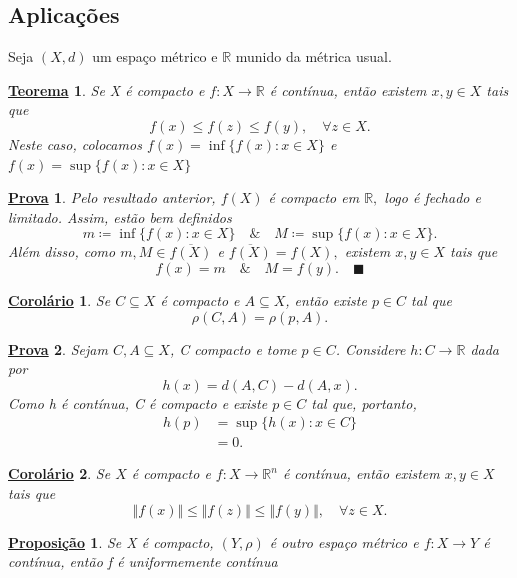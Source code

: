 \documentclass{article}
\newtheorem*{theorem*}{\underline{Teorema}}
\newtheorem*{prop*}{\underline{Proposi\c c\~ao}}
\newtheorem*{crl*}{\underline{Corolário}}
\newtheorem*{proof*}{\underline{Prova}}
\renewcommand\qedsymbol{$\blacksquare$}
\begin{document}
\subsection{Aplicações}
  Seja \((X, d)\) um espaço métrico e \(\mathbb{R}\) munido da métrica usual.
 \begin{theorem*}
  Se X é compacto e \(f:X\rightarrow \mathbb{R}\) é contínua, então existem \(x, y\in X\) tais que 
  \[
    f(x)\leq f(z)\leq f(y),\quad \forall z\in X.
  \]
  Neste caso, colocamos \(f(x)=\inf\{f(x):x\in X\}\) e \(f(x) = \sup\{f(x):x\in X\}\)
 \end{theorem*}
 \begin{proof*}
  Pelo resultado anterior, \(f(X)\) é compacto em \(\mathbb{R},\) logo é fechado e limitado. Assim, estão bem definidos 
    \[
      m\coloneqq \inf\{f(x):x\in X\}\quad\&\quad M\coloneqq \sup\{f(x):x\in X\}.
    \]
    Além disso, como \(m, M\in \overline{f(X)}\) e \(\overline{f(X)} = f(X),\) existem \(x, y\in X\) tais que
      \[
        f(x) = m\quad\&\quad M = f(y).\quad \text{\qedsymbol}
      \]
 \end{proof*}
 \begin{crl*}
  Se \(C\subseteq X\) é compacto e \(A\subseteq X\), então existe \(p\in C\) tal que  
    \[
      \rho (C, A) = \rho (p, A).
    \]
 \end{crl*}
 \begin{proof*}
  Sejam \(C, A\subseteq X\), C compacto e tome \(p\in C\). Considere \(h:C\rightarrow \mathbb{R}\) dada por 
    \[
      h(x) = d(A, C) - d(A, x).
    \]
  Como h é contínua, C é compacto e existe \(p\in C\) tal que, portanto,
 \begin{align*}
  h(p) &= \sup\{h(x):x\in C\}\\ 
       &= 0.
 \end{align*}
 \end{proof*}
 \begin{crl*}
  Se \(X\) é compacto e \(f:X\rightarrow \mathbb{R}^{n}\) é contínua, então existem \(x, y\in X\) tais que 
    \[
      \Vert f(x) \Vert\leq \Vert f(z) \Vert\leq \Vert f(y) \Vert,\quad \forall z\in X.
    \]
 \end{crl*}
\begin{prop*}
  Se X é compacto, \((Y, \rho )\) é outro espaço métrico e \(f:X\rightarrow Y \) é contínua, então f é uniformemente contínua
\end{prop*}
\end{document}
